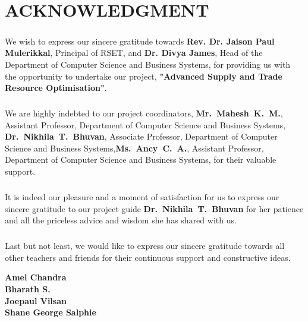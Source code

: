 \chapter*{ACKNOWLEDGMENT}
\setcounter{page}{1}
\vspace{1.5cm}


\paragraph{} We wish to express our sincere gratitude towards \textbf{Rev. Dr. Jaison Paul Mulerikkal}, Principal of RSET, and \textbf{Dr. Divya James}, Head of the Department of Computer Science and Business Systems, for providing us with the opportunity to undertake our project, \textbf{"Advanced Supply and Trade Resource Optimisation"}.

\paragraph{} We are highly indebted to our project coordinators,  \textbf{\mbox{Mr. Mahesh K. M.}}, Assistant Professor, Department of Computer Science and Business Systems, \textbf{\mbox{Dr. Nikhila T. Bhuvan}}, \mbox{Associate} Professor, Department of Computer Science and Business Systems,\textbf{\mbox{Ms. Ancy C. A.}}, Assistant Professor, Department of Computer Science and Business Systems, for their valuable support.

\paragraph{} It is indeed our pleasure and a moment of satisfaction for us to express our sincere gratitude to our project guide \textbf{\mbox{Dr. Nikhila T. Bhuvan}} for her patience and all the priceless advice and wisdom she has shared with us.

\paragraph{} Last but not least, we would like to express our sincere gratitude towards all other teachers and friends for their continuous support and constructive ideas.

\begin{flushright}
	\textbf{Amel Chandra}\\
	\textbf{Bharath S.}\\
	\textbf{Joepaul Vilsan}\\
	\textbf{Shane George Salphie}
\end{flushright}
